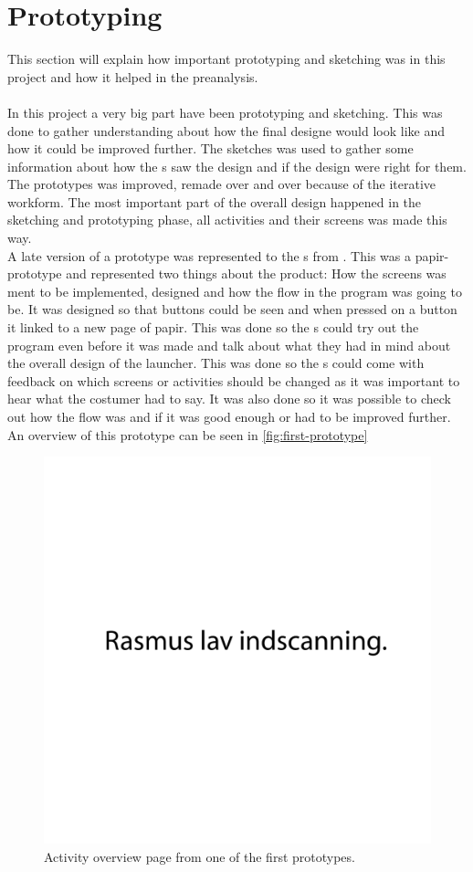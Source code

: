 \section{Prototyping}
This section will explain how important prototyping and sketching was in this project and how it helped in the preanalysis. \\\\

In this project a very big part have been prototyping and sketching. 
This was done to gather understanding about how the final designe would look like and how it could be improved further. 
The sketches was used to gather some information about how the \guardian{}s saw the design and if the design were right for them. 
The prototypes was improved, remade over and over because of the iterative workform. 
The most important part of the overall design happened in the sketching and prototyping phase, all activities and their screens was made this way. \\
A late version of a prototype was represented to the \guardian{}s from \egebakken{}. 
This was a papir-prototype and represented two things about the product: How the screens was ment to be implemented, designed and how the flow in the program was going to be. 
It was designed so that buttons could be seen and when pressed on a button it linked to a new page of papir. 
This was done so the \guardian{}s could try out the program even before it was made and talk about what they had in mind about the overall design of the launcher.
This was done so the \guardian{}s could come with feedback on which screens or activities should be changed as it was important to hear what the costumer had to say. 
It was also done so it was possible to check out how the flow was and if it was good enough or had to be improved further. 
An overview of this prototype can be seen in \autoref{fig:first-prototype}

\begin{figure}[h!]
	\centering
	\includegraphics[scale=0.5]{gfx/first-prototype.pdf}
	\caption{Activity overview page from one of the first prototypes.}
	\label{fig:first-prototype}
\end{figure}

